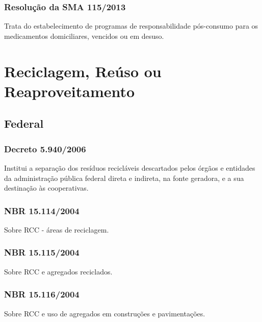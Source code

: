 \begin{subapend}
\begin{subsubapend}
		\subsubsection{Resolução da SMA 115/2013}
		Trata do estabelecimento de programas de responsabilidade pós-consumo para os medicamentos domiciliares, vencidos ou em desuso.
	\end{subsubapend}
\end{subapend}

\section{Reciclagem, Reúso ou Reaproveitamento}

\begin{subapend}
	\subsection{Federal}
	\begin{subsubapend}
		\item \subsubsection{Decreto 5.940/2006}
		Institui a separação dos resíduos recicláveis descartados pelos órgãos e entidades da administração pública federal direta e indireta, na fonte geradora, e a sua destinação às cooperativas.
		\subsubsection{NBR 15.114/2004}
		Sobre RCC - áreas de reciclagem.
		\subsubsection{NBR 15.115/2004}
		Sobre RCC e agregados reciclados.
		\subsubsection{NBR 15.116/2004}
		Sobre RCC e uso de agregados em construções e pavimentações.
	\end{subsubapend}
\end{subapend}



